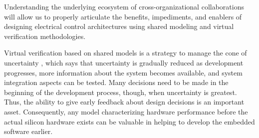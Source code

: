 Understanding the underlying ecosystem of cross-organizational collaborations will allow us to properly articulate the benefits, impediments, and enablers of designing electrical control architectures using shared modeling and virtual verification methodologies.

Virtual verification based on shared models is a strategy to manage the cone of uncertainty \cite{Boehm1981}, 
which says that uncertainty is gradually reduced as development progresses,
more information about the system becomes available,
and system integration aspects can be tested.
Many decisions need to be made in the beginning of the development process, though, when uncertainty is greatest.
Thus, the ability to give early feedback about design decisions is an important asset.
Consequently, any model characterizing hardware performance before the actual silicon hardware exists can be valuable in helping to develop the embedded software earlier.

